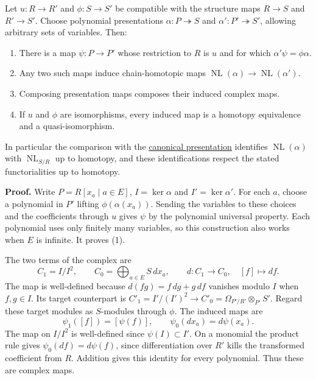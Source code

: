\documentclass[11pt,a4paper,openany]{report}
\providecommand{\tightlist}{\setlength{\itemsep}{0pt}\setlength{\parskip}{0pt}}
\begin{document}
Let \(u:R\to R'\) and \(\phi:S\to S'\) be compatible with the structure maps \(R\to S\) and \(R'\to S'\). Choose polynomial presentations \(\alpha:P\twoheadrightarrow S\) and \(\alpha':P'\twoheadrightarrow S'\), allowing arbitrary sets of variables. Then:

\begin{enumerate}
\def\labelenumi{\arabic{enumi}.}
\tightlist
\item
  There is a map \(\psi:P\to P'\) whose restriction to \(R\) is \(u\) and for which \(\alpha'\psi=\phi\alpha\).
\item
  Any two such maps induce chain-homotopic maps \(\operatorname{NL}(\alpha)\to\operatorname{NL}(\alpha')\).
\item
  Composing presentation maps composes their induced complex maps.
\item
  If \(u\) and \(\phi\) are isomorphisms, every induced map is a homotopy equivalence and a quasi-isomorphism.
\end{enumerate}

In particular the comparison with the \hyperref[AG-RG-S05-cotangent-context]{canonical presentation} identifies \(\operatorname{NL}(\alpha)\) with \(\operatorname{NL}_{S/R}\) up to homotopy, and these identifications respect the stated functorialities up to homotopy.

\textbf{Proof.} Write \(P=R[x_a\mid a\in E]\), \(I=\ker\alpha\) and \(I'=\ker\alpha'\). For each \(a\), choose a polynomial in \(P'\) lifting \(\phi(\alpha(x_a))\). Sending the variables to these choices and the coefficients through \(u\) gives \(\psi\) by the polynomial universal property. Each polynomial uses only finitely many variables, so this construction also works when \(E\) is infinite. It proves (1).

The two terms of the complex are \[C_1=I/I^2,\qquad C_0=\bigoplus_{a\in E}S\,dx_a,\qquad
d:C_1\to C_0,\quad [f]\mapsto df.\] The map is well-defined because \(d(fg)=f\,dg+g\,df\) vanishes modulo \(I\) when \(f,g\in I\). Its target counterpart is \(C'_1=I'/(I')^2\to C'_0=\Omega_{P'/R'}\otimes_{P'}S'\). Regard these target modules as \(S\)-modules through \(\phi\). The induced maps are \[\psi_1([f])=[\psi(f)],\qquad
\psi_0(dx_a)=d\psi(x_a).\] The map on \(I/I^2\) is well-defined since \(\psi(I)\subset I'\). On a monomial the product rule gives \(\psi_0(df)=d\psi(f)\), since differentiation over \(R'\) kills the transformed coefficient from \(R\). Addition gives this identity for every polynomial. Thus these are complex maps.
\end{document}
